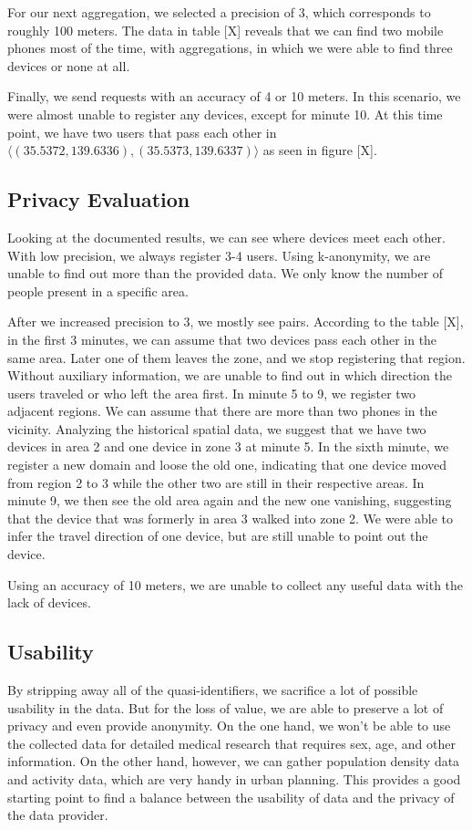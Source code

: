 For our next aggregation, we selected a precision of 3, which corresponds to roughly 100 meters. The data in table [X] reveals that we can find two mobile phones most of the time, with aggregations, in which we were able to find three devices or none at all. 

Finally, we send requests with an accuracy of 4 or 10 meters. In this scenario, we were almost unable to register any devices, except for minute 10. At this time point, we have two users that pass each other in \(\langle(35.5372, 139.6336),(35.5373, 139.6337)\rangle\) as seen in figure [X].

\subsection{Privacy Evaluation}
Looking at the documented results, we can see where devices meet each other. With low precision, we always register 3-4 users. Using k-anonymity, we are unable to find out more than the provided data. We only know the number of people present in a specific area. 

After we increased precision to 3, we mostly see pairs. According to the table [X], in the first 3 minutes, we can assume that two devices pass each other in the same area. Later one of them leaves the zone, and we stop registering that region. Without auxiliary information, we are unable to find out in which direction the users traveled or who left the area first. In minute 5 to 9, we register two adjacent regions. We can assume that there are more than two phones in the vicinity. Analyzing the historical spatial data, we suggest that we have two devices in area 2 and one device in zone 3 at minute 5. In the sixth minute, we register a new domain and loose the old one, indicating that one device moved from region 2 to 3 while the other two are still in their respective areas. In minute 9, we then see the old area again and the new one vanishing, suggesting that the device that was formerly in area 3 walked into zone 2. We were able to infer the travel direction of one device, but are still unable to point out the device.

Using an accuracy of 10 meters, we are unable to collect any useful data with the lack of devices.

\subsection{Usability}
By stripping away all of the quasi-identifiers, we sacrifice a lot of possible usability in the data. But for the loss of value, we are able to preserve a lot of privacy and even provide anonymity. On the one hand, we won't be able to use the collected data for detailed medical research that requires sex, age, and other information. On the other hand, however, we can gather population density data and activity data, which are very handy in urban planning. This provides a good starting point to find a balance between the usability of data and the privacy of the data provider.

